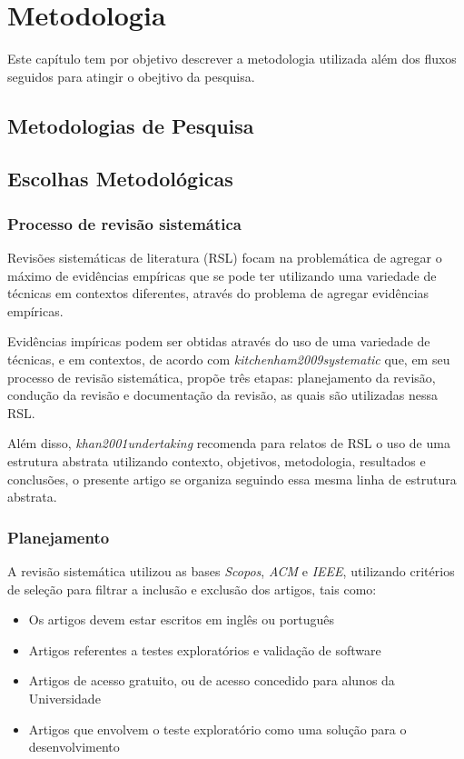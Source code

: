 \chapter[Metodologia]{Metodologia}

Este capítulo tem por objetivo descrever a metodologia utilizada além dos fluxos seguidos para atingir o obejtivo da pesquisa.


\section{Metodologias de Pesquisa}

\section{Escolhas Metodológicas}

\subsection{Processo de revisão sistemática}

Revisões sistemáticas de literatura (RSL) focam na problemática de agregar o máximo de evidências empíricas que se pode ter utilizando uma variedade de técnicas em contextos diferentes, através do problema de agregar evidências empíricas.

Evidências impíricas podem ser obtidas através do uso de uma variedade de técnicas, e em contextos, de acordo com \textit{kitchenham2009systematic} que, em seu processo de revisão sistemática, propõe três etapas: planejamento da revisão, condução da revisão e documentação da revisão, as quais são utilizadas nessa RSL. 

\par Além disso, \textit{khan2001undertaking} recomenda para relatos de RSL o uso de uma estrutura abstrata utilizando contexto, objetivos, metodologia, resultados e conclusões, o presente artigo se organiza seguindo essa mesma linha de estrutura abstrata.

\subsection{Planejamento}
\par A revisão sistemática utilizou as bases \textit{Scopos}, \textit{ACM} e \textit{IEEE}, utilizando critérios de seleção para filtrar a inclusão e exclusão dos artigos, tais como:

\begin{itemize}
    \item Os artigos devem estar escritos em inglês ou português
    \item Artigos referentes a testes exploratórios e validação de software
    \item Artigos de acesso gratuito, ou de acesso concedido para alunos da Universidade
    \item Artigos que envolvem o teste exploratório como uma solução para o desenvolvimento
\end{itemize}

